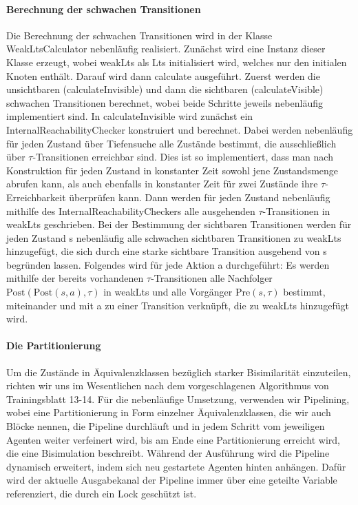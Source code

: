 \documentclass[a4paper]{scrartcl}
\begin{document}
\paragraph*{Berechnung der schwachen Transitionen}
Die Berechnung der schwachen Transitionen wird in der Klasse WeakLtsCalculator nebenläufig realisiert. Zunächst wird eine Instanz dieser Klasse erzeugt, wobei weakLts als Lts initialisiert wird, welches nur den initialen Knoten  enthält. Darauf wird dann calculate ausgeführt. Zuerst werden die unsichtbaren (calculateInvisible) und dann die sichtbaren (calculateVisible) schwachen Transitionen berechnet, wobei beide Schritte jeweils nebenläufig implementiert sind.
In calculateInvisible wird zunächst ein InternalReachabilityChecker konstruiert und berechnet. Dabei werden nebenläufig für jeden Zustand über Tiefensuche alle Zustände bestimmt, die ausschließlich über $\tau$-Transitionen erreichbar sind. Dies ist so implementiert, dass man nach Konstruktion für jeden Zustand in konstanter Zeit sowohl jene Zustandsmenge abrufen kann, als auch ebenfalls in konstanter Zeit für zwei Zustände ihre $\tau$-Erreichbarkeit überprüfen kann. Dann werden für jeden Zustand nebenläufig mithilfe des InternalReachabilityCheckers alle ausgehenden $\tau$-Transitionen in weakLts geschrieben.
Bei der Bestimmung der sichtbaren Transitionen werden für jeden Zustand s nebenläufig alle schwachen sichtbaren Transitionen zu weakLts hinzugefügt, die sich durch eine starke sichtbare Transition ausgehend von s begründen lassen. Folgendes wird für jede Aktion a durchgeführt: Es werden mithilfe der bereits vorhandenen $\tau$-Transitionen alle Nachfolger $\text{Post}(\text{Post}(s,a), \tau)$ in weakLts und alle Vorgänger $\text{Pre}(s, \tau)$ bestimmt, miteinander und mit a zu einer Transition verknüpft, die zu weakLts hinzugefügt wird.

\paragraph*{Die Partitionierung}
Um die Zustände in Äquivalenzklassen bezüglich starker Bisimilarität einzuteilen, richten wir uns im Wesentlichen nach dem vorgeschlagenen Algorithmus von Trainingsblatt 13-14. Für die nebenläufige Umsetzung, verwenden wir Pipelining, wobei eine Partitionierung in Form einzelner Äquivalenzklassen, die wir auch Blöcke nennen, die Pipeline durchläuft und in jedem Schritt vom jeweiligen Agenten weiter verfeinert wird, bis am Ende eine Partitionierung erreicht wird, die eine Bisimulation beschreibt. Während der Ausführung wird die Pipeline dynamisch erweitert, indem sich neu gestartete Agenten hinten anhängen. Dafür wird der aktuelle Ausgabekanal der Pipeline immer über eine geteilte Variable referenziert, die durch ein Lock geschützt ist.
\end{document}
